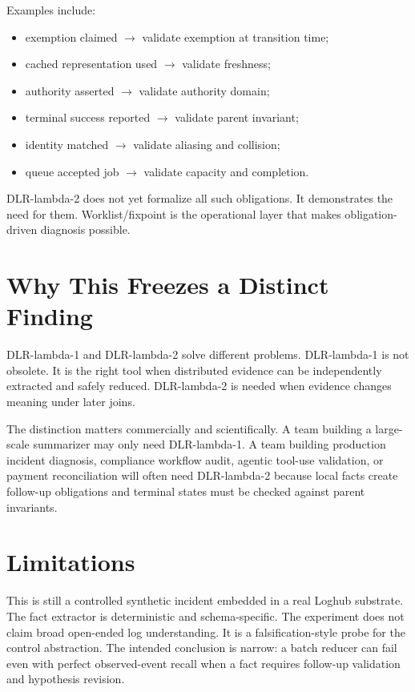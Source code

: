 \documentclass[11pt]{article}
\begin{document}
Examples include:

\begin{itemize}
  \item exemption claimed $\rightarrow$ validate exemption at transition time;
  \item cached representation used $\rightarrow$ validate freshness;
  \item authority asserted $\rightarrow$ validate authority domain;
  \item terminal success reported $\rightarrow$ validate parent invariant;
  \item identity matched $\rightarrow$ validate aliasing and collision;
  \item queue accepted job $\rightarrow$ validate capacity and completion.
\end{itemize}

DLR-lambda-2 does not yet formalize all such obligations. It demonstrates the
need for them. Worklist/fixpoint is the operational layer that makes
obligation-driven diagnosis possible.

\section{Why This Freezes a Distinct Finding}

DLR-lambda-1 and DLR-lambda-2 solve different problems. DLR-lambda-1 is not
obsolete. It is the right tool when distributed evidence can be independently
extracted and safely reduced. DLR-lambda-2 is needed when evidence changes
meaning under later joins.

The distinction matters commercially and scientifically. A team building a
large-scale summarizer may only need DLR-lambda-1. A team building production
incident diagnosis, compliance workflow audit, agentic tool-use validation, or
payment reconciliation will often need DLR-lambda-2 because local facts create
follow-up obligations and terminal states must be checked against parent
invariants.

\section{Limitations}

This is still a controlled synthetic incident embedded in a real Loghub
substrate. The fact extractor is deterministic and schema-specific. The
experiment does not claim broad open-ended log understanding. It is a
falsification-style probe for the control abstraction. The intended conclusion
is narrow: a batch reducer can fail even with perfect observed-event recall when
a fact requires follow-up validation and hypothesis revision.
\end{document}
